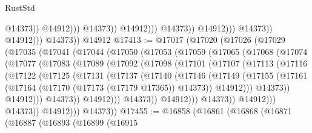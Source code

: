 \begin{lexlean}{RustStd}
\begin{coremodule}
                                                @14373))
                                            @14912)))
                                      @14373))
                                  @14912)))
                            @14373))
                        @14912)))
                  @14373))
              @14912)))
        @14373))
    @14912
@17413 := @17017
    (@17020
      (@17026
        (@17029
          (@17035
            (@17041
              (@17044
                (@17050
                  (@17053
                    (@17059
                      (@17065
                        (@17068
                          (@17074
                            (@17077
                              (@17083
                                (@17089
                                  (@17092
                                    (@17098
                                      (@17101
                                        (@17107
                                          (@17113
                                            (@17116
                                              (@17122
                                                (@17125
                                                  (@17131
                                                    (@17137
                                                      (@17140
                                                        (@17146
                                                          (@17149
                                                            (@17155
                                                              (@17161
                                                                (@17164
                                                                  (@17170
                                                                    (@17173 (@17179 @17365))
                                                                    @14373))
                                                                @14912)))
                                                          @14373))
                                                      @14912)))
                                                @14373))
                                            @14912)))
                                      @14373))
                                  @14912)))
                            @14373))
                        @14912)))
                  @14373))
              @14912)))
        @14373))
@17455 := @16858
    (@16861
      (@16868
        (@16871
          (@16887
            (@16893
              (@16899
                (@16915

\end{coremodule}
\end{lexlean}
